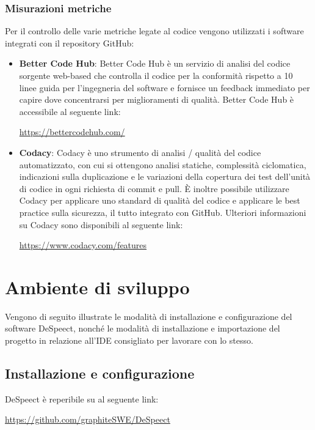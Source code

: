 \documentclass[openany,12pt,a4paper]{report}
\begin{document}
	\subsection{Misurazioni metriche}
	Per il controllo delle varie metriche legate al codice vengono utilizzati i software integrati con il repository GitHub:
	\begin{itemize}
		\item \textbf{Better Code Hub}: Better Code Hub è un servizio di analisi del codice sorgente web-based che controlla il codice per la conformità rispetto a 10 linee guida per l'ingegneria del software e fornisce un feedback immediato per capire dove concentrarsi per miglioramenti di qualità. Better Code Hub è accessibile al seguente link:
		\begin{center}
			\url{https://bettercodehub.com/}
		\end{center}
		
		\item \textbf{Codacy}: Codacy è uno strumento di analisi / qualità del codice automatizzato, con cui si ottengono analisi statiche, complessità ciclomatica, indicazioni sulla duplicazione e le variazioni della copertura dei test dell'unità di codice in ogni richiesta di commit e pull. È inoltre possibile utilizzare Codacy per applicare uno standard di qualità del codice e applicare le best practice sulla sicurezza, il tutto integrato con GitHub. Ulteriori informazioni su Codacy sono disponibili al seguente link:
		\begin{center}
			\url{https://www.codacy.com/features}
		\end{center}
	\end{itemize} 
	
	\chapter{Ambiente di sviluppo}
	
	Vengono di seguito illustrate le modalità di installazione e configurazione del software DeSpeect, nonché le modalità di installazione e importazione del progetto in relazione all'IDE consigliato per lavorare con lo stesso.
	
	\section{Installazione e configurazione}
	
	DeSpeect è reperibile su  al seguente link:
	\begin{center}
		\url{https://github.com/graphiteSWE/DeSpeect}
	\end{center}
	
\end{document}
